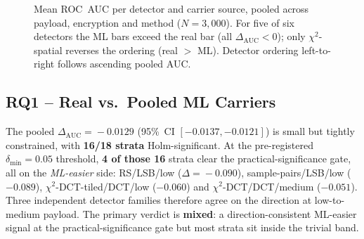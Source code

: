 \documentclass[10pt,twocolumn,a4paper]{article}
\begin{document}
\begin{figure}[t]
\caption{Mean ROC~AUC per detector and carrier source, pooled across payload, encryption and method ($N\!=\!3{,}000$). For five of six detectors the ML bars exceed the real bar (all $\Delta_\text{AUC}\!<\!0$); only $\chi^2$-spatial reverses the ordering (real $>$ ML). Detector ordering left-to-right follows ascending pooled AUC.}
\label{fig:headline}
\end{figure}

\subsection{RQ1 -- Real vs.\ Pooled ML Carriers}
\label{sec:rq1}

The pooled $\Delta_\text{AUC}\!=\!-0.0129$ (95\%~CI $[-0.0137,-0.0121]$) is small but tightly constrained, with \textbf{16/18 strata} Holm-significant. At the pre-registered $\delta_\text{min}\!=\!0.05$ threshold, \textbf{4 of those 16} strata clear the practical-significance gate, all on the \emph{ML-easier} side: RS/LSB/low ($\Delta\!=\!-0.090$), sample-pairs/LSB/low ($-0.089$), $\chi^2$-DCT-tiled/DCT/low ($-0.060$) and $\chi^2$-DCT/DCT/medium ($-0.051$). Three independent detector families therefore agree on the direction at low-to-medium payload. The primary verdict is \textbf{mixed}: a direction-consistent ML-easier signal at the practical-significance gate but most strata sit inside the trivial band.
\end{document}
